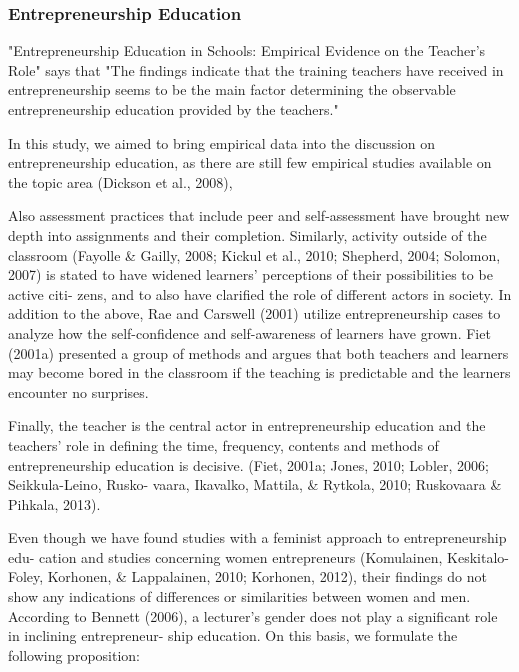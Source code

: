 \subsubsection{Entrepreneurship Education}

"Entrepreneurship Education in Schools: Empirical Evidence on the Teacher’s Role" says that "The findings indicate that the training teachers have received in entrepreneurship seems to be the main factor determining the observable entrepreneurship education provided by the teachers."


In this study, we aimed to bring empirical data into the discussion on entrepreneurship education, as there are still few empirical studies available on the topic area (Dickson et al., 2008),

Also assessment practices that include peer and self-assessment have brought new depth into assignments and their completion. Similarly, activity outside of the classroom (Fayolle \& Gailly, 2008; Kickul et al., 2010; Shepherd, 2004; Solomon, 2007) is stated to have widened learners’ perceptions of their possibilities to be active citi- zens, and to also have clarified the role of different actors in society. In addition to the above, Rae and Carswell (2001) utilize entrepreneurship cases to analyze how the self-confidence and self-awareness of learners have grown.
Fiet (2001a) presented a group of methods and argues that both teachers and learners may become bored in the classroom if the teaching is predictable and the learners encounter no surprises.

Finally, the teacher is the central actor in entrepreneurship education and the teachers’ role in defining the time, frequency, contents and methods of entrepreneurship education is decisive. (Fiet, 2001a; Jones, 2010; Lobler, 2006; Seikkula-Leino, Rusko- vaara, Ikavalko, Mattila, \& Rytkola, 2010; Ruskovaara \& Pihkala, 2013).

Even though we have found studies with a feminist approach to entrepreneurship edu- cation and studies concerning women entrepreneurs (Komulainen, Keskitalo-Foley, Korhonen, \& Lappalainen, 2010; Korhonen, 2012), their findings do not show any indications of differences or similarities between women and men. According to Bennett (2006), a lecturer’s gender does not play a significant role in inclining entrepreneur- ship education. On this basis, we formulate the following proposition:

